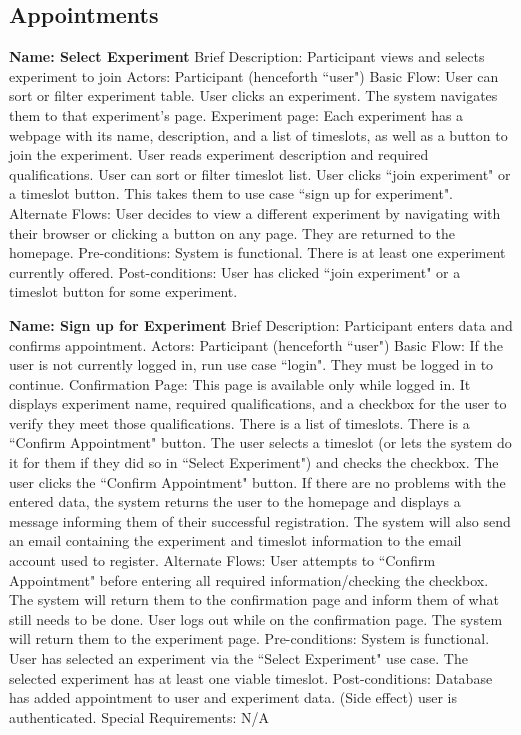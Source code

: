 \subsection{Appointments}
\begin{outline}[enumerate]


\1 {\bf Name: Select Experiment}
\2 Brief Description: Participant views and selects experiment to join
\2 Actors: Participant (henceforth ``user")
\2 Basic Flow:
\3 User can sort or filter experiment table.
\3 User clicks an experiment.  The system navigates them to that experiment's page.
\3 Experiment page: Each experiment has a webpage with its name, description, and a list of timeslots, as well as a button to join the experiment.
\3 User reads experiment description and required qualifications.
\3 User can sort or filter timeslot list.
\3 User clicks ``join experiment" or a timeslot button.  This takes them to use case ``sign up for experiment".
\2 Alternate Flows:
\3 User decides to view a different experiment by navigating with their browser or clicking a button on any page.  They are returned to the homepage.
\2 Pre-conditions:
\3 System is functional.
\3 There is at least one experiment currently offered.
\2 Post-conditions:
\3 User has clicked ``join experiment" or a timeslot button for some experiment.

\1 {\bf Name: Sign up for Experiment}
\2 Brief Description: Participant enters data and confirms appointment.
\2 Actors: Participant (henceforth ``user")
\2 Basic Flow:
\3 If the user is not currently logged in, run use case ``login".  They must be logged in to continue.
\3 Confirmation Page: This page is available only while logged in.  It displays experiment name, required qualifications, and a checkbox for the user to verify they meet those qualifications. There is a list of timeslots. There is a ``Confirm Appointment" button.
\3 The user selects a timeslot (or lets the system do it for them if they did so in ``Select Experiment") and checks the checkbox.
\3 The user clicks the ``Confirm Appointment" button.
\3 If there are no problems with the entered data, the system returns the user to the homepage and displays a message informing them of their successful registration.  The system will also send an email containing the experiment and timeslot information to the email account used to register.
\2 Alternate Flows:
\3 User attempts to ``Confirm Appointment" before entering all required information/checking the checkbox.
\4 The system will return them to the confirmation page and inform them of what still needs to be done.
\3 User logs out while on the confirmation page.  The system will return them to the experiment page.
\2 Pre-conditions:
\3 System is functional.
\3 User has selected an experiment via the ``Select Experiment" use case.
\3 The selected experiment has at least one viable timeslot.
\2 Post-conditions:
\3 Database has added appointment to user and experiment data.
\3 (Side effect) user is authenticated.
\2 Special Requirements:
\3 N/A

\end{outline}
